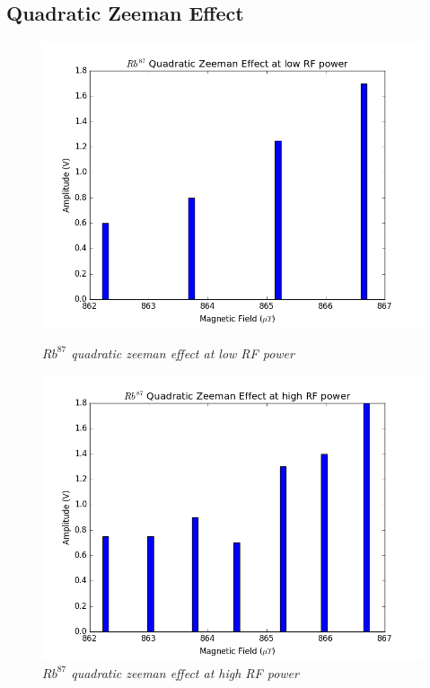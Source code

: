 \documentclass[twocolumn]{article}
\begin{document}
\subsection{Quadratic Zeeman Effect}
\begin{figure}
\begin{minipage}[t]{0.45\linewidth}
\includegraphics[width=\linewidth]{pictures/rb87-low.png}
\caption{\textit{$Rb^{87}$ quadratic zeeman effect at low RF power}}
\label{fig:24}
\end{minipage}
\hfill
\begin{minipage}[t]{0.45\linewidth}
\includegraphics[width=\linewidth]{pictures/rb87-high.png}
\caption{\textit{$Rb^{87}$ quadratic zeeman effect at high RF power}}

\end{minipage}
\end{figure}
\end{document}
